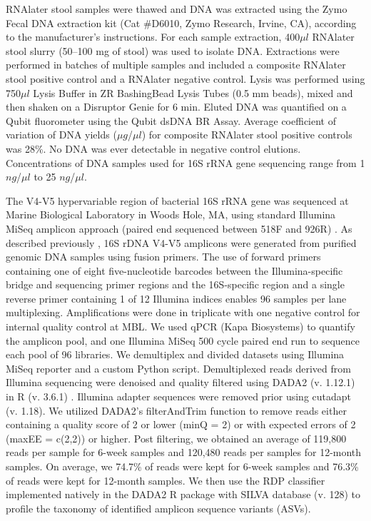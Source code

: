 RNAlater stool samples were thawed and DNA was extracted using the Zymo Fecal DNA extraction kit (Cat \#D6010, Zymo Research, Irvine, CA), according to the manufacturer’s instructions. For each sample extraction, 400$\mu l$ RNAlater stool slurry (50–100 mg of stool) was used to isolate DNA. Extractions were performed in batches of multiple samples and included a composite RNAlater stool positive control and a RNAlater negative control. Lysis was performed using 750$\mu l$ Lysis Buffer in ZR BashingBead\texttrademark{} Lysis Tubes (0.5 mm beads), mixed and then shaken on a Disruptor Genie for 6 min. Eluted DNA was quantified on a Qubit\texttrademark{} fluorometer using the Qubit\texttrademark{} dsDNA BR Assay. Average coefficient of variation of DNA yields ($\mu g$/$\mu l$) for composite RNAlater stool positive controls was 28\%. No DNA was ever detectable in negative control elutions.  Concentrations of DNA samples used for 16S rRNA gene sequencing range from 1 $ng$/$\mu l$ to 25 $ng$/$\mu l$.

The V4-V5 hypervariable region of bacterial 16S rRNA gene was sequenced at Marine Biological Laboratory in Woods Hole, MA, using standard Illumina MiSeq amplicon approach (paired end sequenced between 518F and 926R) \cite{newton2015sewage, huse2014comparison}. As described previously \cite{madan2016effects, lundgren2018maternal}, 16S rDNA V4-V5 amplicons were generated from purified genomic DNA samples using fusion primers. The use of forward primers containing one of eight five-nucleotide barcodes between the Illumina-specific bridge and sequencing primer regions and the 16S-specific region and a single reverse primer containing 1 of 12 Illumina indices enables 96 samples per lane multiplexing. Amplifications were done in triplicate with one negative control for internal quality control at MBL. We used qPCR (Kapa Biosystems) to quantify the amplicon pool, and one Illumina MiSeq 500 cycle paired end run to sequence each pool of 96 libraries. We demultiplex and divided datasets using Illumina MiSeq reporter and a custom Python script.  Demultiplexed reads derived from Illumina sequencing were denoised and quality filtered using DADA2 (v. 1.12.1) \cite{callahan2016dada2} in R (v. 3.6.1) \cite{rcoreteam2021language}. Illumina adapter sequences were removed prior using cutadapt (v. 1.18). We utilized DADA2’s filterAndTrim function to remove reads either containing a quality score of 2 or lower (minQ = 2) or with expected errors \cite{edgar2015error} of 2 (maxEE = c(2,2)) or higher. Post filtering, we obtained an average of 119,800 reads per sample for 6-week samples and 120,480 reads per samples for 12-month samples. On average, we 74.7\% of reads were kept for 6-week samples and 76.3\% of reads were kept for 12-month samples. We then use the RDP classifier implemented natively in the DADA2 R package with SILVA database (v. 128) to profile the taxonomy of identified amplicon sequence variants (ASVs). 

